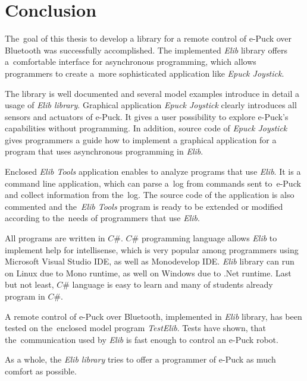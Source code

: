 \chapter{Conclusion} \label{chap:conclusion}
  The~goal of this thesis to develop a library for a remote control of e-Puck 
  over Bluetooth was successfully accomplished.
  The implemented {\it Elib} library offers a~comfortable interface for asynchronous programming,
  which allows programmers to create a~more sophisticated application like {\it Epuck Joystick}.
  
  The library is well documented and several model examples introduce in detail
  a usage of {\it Elib library}.
  Graphical application {\it Epuck Joystick} clearly introduces all sensors and actuators of e-Puck. 
  It gives a user possibility to explore e-Puck's capabilities without programming.
  In addition, source code of {\it Epuck Joystick} gives programmers a guide 
  how to implement a graphical application for a program 
  that uses asynchronous programming in {\it Elib}. 

  Enclosed {\it Elib Tools} application enables to analyze
  programs that use {\it Elib}.
  It is a command line application, which can parse a~log from commands sent 
  to~e-Puck and collect information from the~log.
  The source code of the application is also commented and 
  the~{\it Elib Tools} program is ready to be extended 
  or modified according to the~needs of programmers that use {\it Elib}.
  
  All programs are written in $C\#$.  $C\#$ programming language
  allows {\it Elib} to implement help for intellisense,
  which is very popular among programmers using Microsoft Visual Studio IDE,
  as well as Monodevelop IDE. {\it Elib} library can run on Linux due to
  Mono runtime, as well on Windows due to .Net runtime.
  Last but not least, $C\#$ language is easy to learn 
  and many of students already program in $C\#$.

  A remote control of e-Puck over Bluetooth, implemented in {\it Elib} library, 
  has been tested on the~enclosed model program {\it TestElib}. 
  Tests have shown, that the~communication used by {\it Elib} is fast enough
  to control an e-Puck robot.

  As a whole, the {\it Elib library} tries to offer a programmer
  of e-Puck as much comfort as possible.

